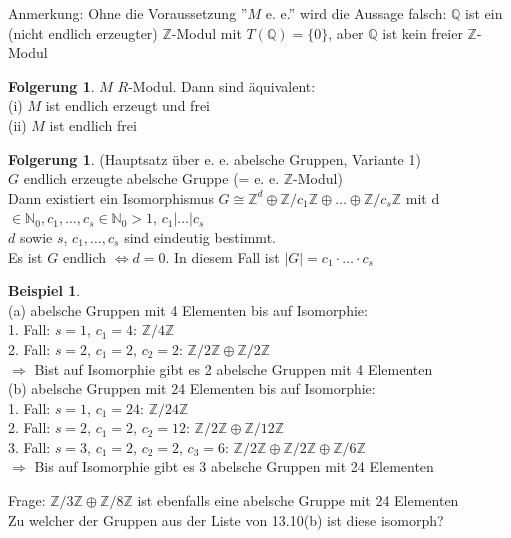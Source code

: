 \documentclass[10pt,a4paper,numbers=endperiod]{scrartcl}
\theoremstyle{definition}
\newtheorem{bsp}[satz]{Beispiel}
\newtheorem{folg}[satz]{Folgerung}
\def\QQ{{\mathbb Q}}
\def\NN{{\mathbb N}}
\def\ZZ{{\mathbb Z}}
\begin{document}
Anmerkung: Ohne die Voraussetzung ''$M$ e. e.'' wird die Aussage falsch: $\QQ$ ist ein (nicht endlich erzeugter) $\ZZ$-Modul mit $T(\QQ) = \{0\}$, aber $\QQ$ ist kein freier $\ZZ$-Modul

\begin{folg}
	$M$ $R$-Modul. Dann sind äquivalent:\\
	(i) $M$ ist endlich erzeugt und frei\\
	(ii) $M$ ist endlich frei
\end{folg}

\begin{folg}
	(Hauptsatz über e. e. abelsche Gruppen, Variante 1)\\
	$G$ endlich erzeugte abelsche Gruppe (= e. e. $\ZZ$-Modul)\\
	Dann existiert ein Isomorphismus $G \cong \ZZ^d \oplus \ZZ/c_1\ZZ \oplus \ldots \oplus \ZZ/c_s\ZZ$ mit d $\in \NN_0, c_1, \ldots, c_s \in \NN_0{>1}$, $c_1|\ldots|c_s$\\
	$d$ sowie $s$, $c_1, \ldots, c_s$ sind eindeutig bestimmt.\\
	Es ist $G$ endlich $\Leftrightarrow d = 0$. In diesem Fall ist $|G| = c_1 \cdot \ldots \cdot c_s$
\end{folg}

\begin{bsp}
	$ $\\
	(a) abelsche Gruppen mit 4 Elementen bis auf Isomorphie:\\
	1. Fall: $s = 1$, $c_1 = 4$: $\ZZ/4\ZZ$\\
	2. Fall: $s = 2$, $c_1= 2$, $c_2 = 2$: $\ZZ/2\ZZ \oplus\ZZ/2\ZZ$\\
	$\Rightarrow$ Bist auf Isomorphie gibt es 2 abelsche Gruppen mit 4 Elementen\\
	(b) abelsche Gruppen mit 24 Elementen bis auf Isomorphie:\\
	1. Fall: $s = 1$, $c_1 = 24$: $\ZZ/24\ZZ$\\
	2. Fall: $s = 2$, $c_1 = 2$, $c_2 = 12$: $\ZZ/2\ZZ \oplus \ZZ/12\ZZ$\\
	3. Fall: $s = 3$, $c_1 = 2$, $c_2 = 2$, $c_3 = 6$: $\ZZ/2\ZZ \oplus \ZZ/2\ZZ \oplus \ZZ/6\ZZ$\\
	$\Rightarrow$ Bis auf Isomorphie gibt es 3 abelsche Gruppen mit 24 Elementen
\end{bsp}

Frage: $\ZZ/3\ZZ \oplus \ZZ/8\ZZ$ ist ebenfalls eine abelsche Gruppe mit 24 Elementen\\
Zu welcher der Gruppen aus der Liste von 13.10(b) ist diese isomorph?
\end{document}
